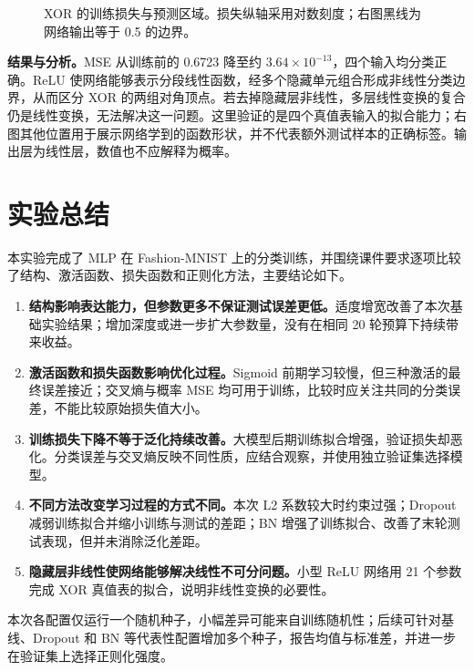 \documentclass[UTF8,11pt,a4paper,fontset=fandol]{ctexart}
\begin{document}
\begin{figure}[H]
\begin{minipage}[t]{0.49\textwidth}
\end{minipage}
\caption{XOR 的训练损失与预测区域。损失纵轴采用对数刻度；右图黑线为网络输出等于 0.5 的边界。}\label{fig:xor}
\end{figure}
\textbf{结果与分析。}MSE 从训练前的 0.6723 降至约 $3.64\times10^{-13}$，四个输入均分类正确。ReLU 使网络能够表示分段线性函数，经多个隐藏单元组合形成非线性分类边界，从而区分 XOR 的两组对角顶点。若去掉隐藏层非线性，多层线性变换的复合仍是线性变换，无法解决这一问题。这里验证的是四个真值表输入的拟合能力；右图其他位置用于展示网络学到的函数形状，并不代表额外测试样本的正确标签。输出层为线性层，数值也不应解释为概率。

\section{实验总结}
本实验完成了 MLP 在 Fashion-MNIST 上的分类训练，并围绕课件要求逐项比较了结构、激活函数、损失函数和正则化方法，主要结论如下。
\begin{enumerate}
\item \textbf{结构影响表达能力，但参数更多不保证测试误差更低。}适度增宽改善了本次基础实验结果；增加深度或进一步扩大参数量，没有在相同 20 轮预算下持续带来收益。
\item \textbf{激活函数和损失函数影响优化过程。}Sigmoid 前期学习较慢，但三种激活的最终误差接近；交叉熵与概率 MSE 均可用于训练，比较时应关注共同的分类误差，不能比较原始损失值大小。
\item \textbf{训练损失下降不等于泛化持续改善。}大模型后期训练拟合增强，验证损失却恶化。分类误差与交叉熵反映不同性质，应结合观察，并使用独立验证集选择模型。
\item \textbf{不同方法改变学习过程的方式不同。}本次 L2 系数较大时约束过强；Dropout 减弱训练拟合并缩小训练与测试的差距；BN 增强了训练拟合、改善了末轮测试表现，但并未消除泛化差距。
\item \textbf{隐藏层非线性使网络能够解决线性不可分问题。}小型 ReLU 网络用 21 个参数完成 XOR 真值表的拟合，说明非线性变换的必要性。
\end{enumerate}
本次各配置仅运行一个随机种子，小幅差异可能来自训练随机性；后续可针对基线、Dropout 和 BN 等代表性配置增加多个种子，报告均值与标准差，并进一步在验证集上选择正则化强度。
\end{document}
